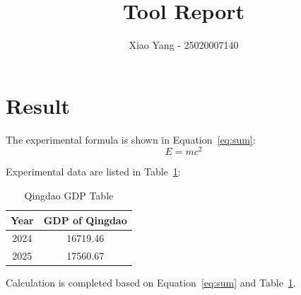 \documentclass{article}
\begin{document}
\title{Tool Report}
\author{Xiao Yang - 25020007140}
\maketitle

\section{Result}

The experimental formula is shown in Equation~\eqref{eq:sum}:
\begin{equation}
E = mc^2
\label{eq:sum}
\end{equation}

Experimental data are listed in Table~\ref{tab:data}:
\begin{table}[h]
\centering
\caption{Qingdao GDP Table}
\label{tab:data}
\begin{tabular}{|c|c|}
\hline
Year & GDP of Qingdao \\
\hline
2024 & 16719.46 \\
\hline
2025 & 17560.67 \\
\hline
\end{tabular}
\end{table}

Calculation is completed based on Equation~\eqref{eq:sum} and Table~\ref{tab:data}.
\end{document}
